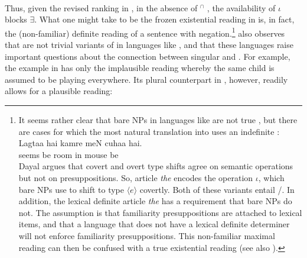 \documentclass[output=paper,
modfonts
]{langscibook}
\begin{document}
	\ea \label{ex:despic:37}
	 \\
	 \citep[420]{Dayal2004} 
	\z 
	\z 
	
	Thus, given the revised ranking in , in the absence of $^\cap$ , the availability of $\iota$ blocks $\exists$. What one might take to be the frozen existential reading in  is, in fact, the (non-familiar) definite reading of a sentence with negation.\footnote{It seems rather clear that bare NPs in languages like  are not true , but there are cases for which the most natural translation into  uses an indefinite \citep[1101]{Dayal2011}: 
		\ea \label{ex:despic:n9}
		\textnormal{} \\
		\gll Lagtaa hai kamre meN cuhaa hai. \\
		{seems} {be} {room} {in} {mouse} {be} \\ 
		\z
		Dayal argues that covert and overt type shifts agree on semantic operations but not on presuppositions. So,  article \textit{the} encodes the operation $\iota$, which  bare NPs use to shift to type $\langle e\rangle$ covertly. Both of these variants entail /. In addition, the lexical definite article \textit{the} has a  requirement that  bare NPs do not. The assumption is that familiarity presuppositions are attached to lexical items, and that a language that does not have a lexical definite determiner will not enforce familiarity presuppositions. This non-familiar maximal
		reading can then be confused with a true existential reading (see also \citealt{Heim2011}).} \citet{Dayal2004} also observes that  are not trivial variants of  in languages like , and that these languages raise important questions about the connection between singular  and . For example, the  example in  has only the implausible reading whereby the same child is assumed to be playing everywhere. Its plural counterpart in , however, readily allows for a plausible reading:
	
\end{document}
